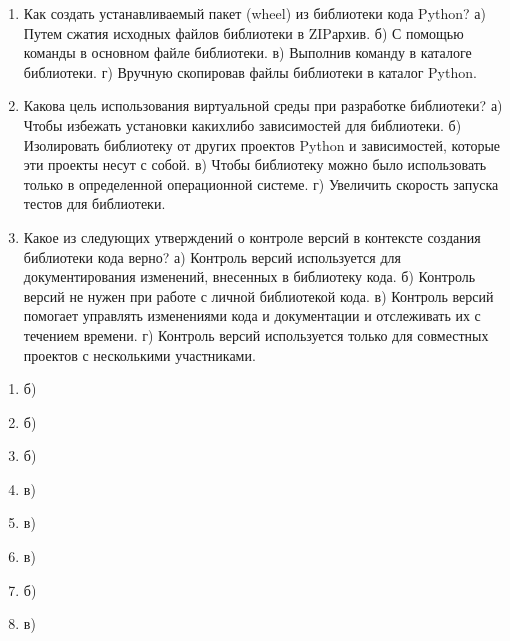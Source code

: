\documentclass[letterpaper,10pt,russian]{sphinxmanual}
\begin{document}
\begin{enumerate}
\item {} 
\sphinxAtStartPar
Как создать устанавливаемый пакет (wheel) из библиотеки кода Python?
а) Путем сжатия исходных файлов библиотеки в ZIP\sphinxhyphen{}архив.
б) С помощью команды  в основном файле библиотеки.
в) Выполнив команду  в каталоге библиотеки.
г) Вручную скопировав файлы библиотеки в каталог  Python.

\item {} 
\sphinxAtStartPar
Какова цель использования виртуальной среды при разработке библиотеки?
а) Чтобы избежать установки каких\sphinxhyphen{}либо зависимостей для библиотеки.
б) Изолировать библиотеку от других проектов Python и зависимостей, которые эти проекты несут с собой.
в) Чтобы библиотеку можно было использовать только в определенной операционной системе.
г) Увеличить скорость запуска тестов для библиотеки.

\item {} 
\sphinxAtStartPar
Какое из следующих утверждений о контроле версий в контексте создания библиотеки кода верно?
а) Контроль версий используется для документирования изменений, внесенных в библиотеку кода.
б) Контроль версий не нужен при работе с личной библиотекой кода.
в) Контроль версий помогает управлять изменениями кода и документации и отслеживать их с течением времени.
г) Контроль версий используется только для совместных проектов с несколькими участниками.

\end{enumerate}

\sphinxAtStartPar
{}
\begin{enumerate}
%
\item {} 
\sphinxAtStartPar
б)

\item {} 
\sphinxAtStartPar
б)

\item {} 
\sphinxAtStartPar
б)

\item {} 
\sphinxAtStartPar
в)

\item {} 
\sphinxAtStartPar
в)

\item {} 
\sphinxAtStartPar
в)

\item {} 
\sphinxAtStartPar
б)

\item {} 
\sphinxAtStartPar
в)

\end{enumerate}
\end{document}
